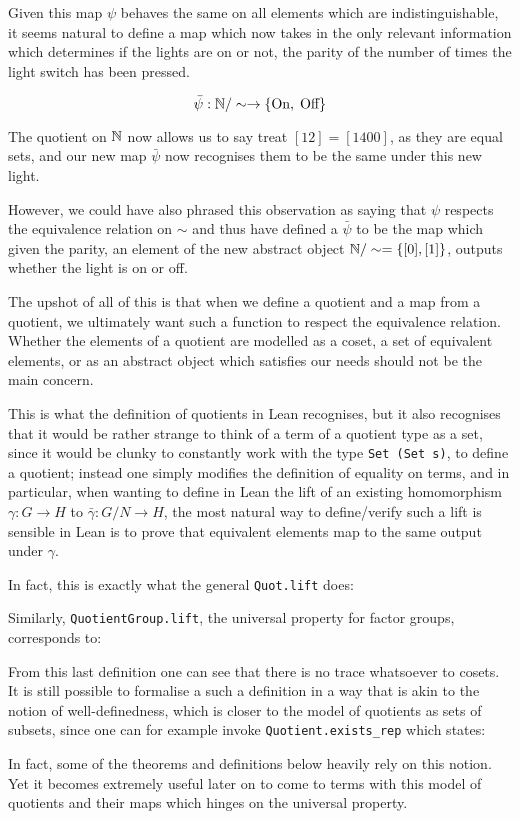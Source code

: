 \begin{remark}
    Given this map $\psi$ behaves the same on all elements which are indistinguishable, it seems natural to 
    define a map which now takes in the only relevant information which determines if the lights are on or not,
    the parity of the number of times the light switch has been pressed.
    
    \[
    \bar{\psi} : \mathbb{N} / \sim \rightarrow \{\text{On}, \; \text{Off}\}
    \]

    The quotient on $\mathbb{N}$ now allows us to say treat $[12] = [1400]$, as they are equal sets, and our new map $\bar{\psi}$ now recognises them to be the same
    under this new light. 

    However, we could have also phrased this observation as saying that $\psi$ respects the equivalence relation on $\sim$ and
    thus have defined a $\bar{\psi}$ to be the map which given the parity, an element of the new abstract object $\mathbb{N} / \sim = \{[0], [1]\}$,
    outputs whether the light is on or off. 

    The upshot of all of this is that when we define a quotient and a map from a quotient, we ultimately want such a function to respect the equivalence relation. Whether the elements of a quotient are
    modelled as a coset, a set of equivalent elements, or as an abstract object which satisfies our needs should not be the main concern. 

    This is what the definition of quotients in Lean recognises, but it also recognises that it would be rather strange to think of a term of a quotient type as a set, since it would be clunky to  constantly work with
    the type \texttt{Set (Set s)}, to define a quotient;  instead one simply modifies the definition of equality on terms, and in particular, when wanting to define in Lean the lift of an existing homomorphism $\gamma : G \rightarrow H$
    to $\bar{\gamma} : G/N \rightarrow H$, the most natural way to define/verify such a lift is sensible in Lean is to prove that equivalent elements map to the same output under $\gamma$.

    In fact, this is exactly what the general \texttt{Quot.lift} does:

 

    Similarly, \texttt{QuotientGroup.lift}, the universal property for factor groups, corresponds to:

    

    From this last definition one can see that there is no trace whatsoever to cosets. It is still possible to formalise a such a
    definition in a way that is akin to the notion of well-definedness, which is closer to the model of quotients as sets of subsets,
    since one can for example invoke \texttt{Quotient.exists_rep} which states:

   
    
    In fact, some of the theorems and definitions below heavily rely on this notion.
    Yet it becomes extremely useful later on to come to terms with this model of quotients and their maps which
    hinges on the universal property.
    \end{remark}

